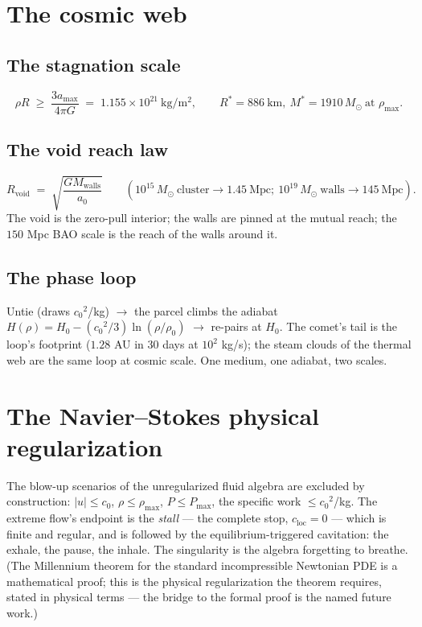 \documentclass[11pt, a4paper]{article}
\newcommand{\cnot}{\ensuremath{c_0}}
\newcommand{\rhonot}{\ensuremath{\rho_0}}
\newcommand{\rhomax}{\ensuremath{\rho_{\mathrm{max}}}}
\newcommand{\Hnot}{\ensuremath{H_0}}
\begin{document}
\section{The cosmic web}

\subsection{The stagnation scale}
\begin{equation}
\rho R \;\ge\; \frac{3a_{\max}}{4\pi G} \;=\; 1.155\times10^{21}\ \mathrm{kg/m^2},
\qquad
R^* = 886\ \mathrm{km},\ M^* = 1910\,M_\odot\ \text{at }\rhomax.
\end{equation}

\subsection{The void reach law}
\begin{equation}
R_{\mathrm{void}} \;=\; \sqrt{\frac{G M_{\mathrm{walls}}}{a_0}}
\qquad
(10^{15}\,M_\odot\ \text{cluster} \to 1.45\ \text{Mpc};\
10^{19}\,M_\odot\ \text{walls} \to 145\ \text{Mpc}).
\end{equation}
The void is the zero-pull interior; the walls are pinned at the mutual reach; the
$150$ Mpc BAO scale is the reach of the walls around it.

\subsection{The phase loop}
Untie (draws $\cnot^2$/kg) $\to$ the parcel climbs the adiabat
$H(\rho) = \Hnot - (\cnot^2/3)\ln(\rho/\rhonot)$ $\to$ re-pairs at $\Hnot$.
The comet's tail is the loop's footprint ($1.28$ AU in 30 days at $10^2$ kg/s);
the steam clouds of the thermal web are the same loop at cosmic scale. One
medium, one adiabat, two scales.

\section{The Navier--Stokes physical regularization}

The blow-up scenarios of the unregularized fluid algebra are excluded by
construction: $|u| \le \cnot$, $\rho \le \rhomax$, $P \le P_{\max}$, the specific
work $\le \cnot^2$/kg. The extreme flow's endpoint is the \emph{stall} --- the
complete stop, $c_{\mathrm{loc}} = 0$ --- which is finite and regular, and is
followed by the equilibrium-triggered cavitation: the exhale, the pause, the
inhale. The singularity is the algebra forgetting to breathe. (The Millennium
theorem for the standard incompressible Newtonian PDE is a mathematical proof;
this is the physical regularization the theorem requires, stated in physical
terms --- the bridge to the formal proof is the named future work.)
\end{document}
